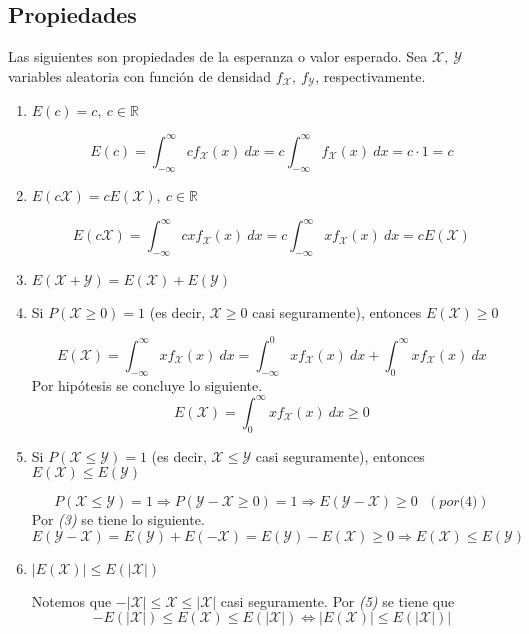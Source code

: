 \subsection{Propiedades}
Las siguientes son propiedades de la esperanza o valor esperado. Sea $\mathcal X,~ \mathcal Y$ variables aleatoria con función de densidad $f_{\mathcal X},~ f_{\mathcal Y}$, respectivamente.
\begin{enumerate}
  \item $E(c) = c,~ c \in \mathbb R$
    \begin{myproof}
      \[E(c) = \int_{-\infty}^{\infty} c f_{\mathcal X}(x)~dx = c \int_{-\infty}^{\infty} f_{\mathcal X}(x)~dx = c \cdot 1 = c\]
    \end{myproof}
  \item $E(c \mathcal X) = c E(\mathcal X),~ c \in \mathbb R$
    \begin{myproof}
      \[E(c\mathcal X) = \int_{-\infty}^{\infty} cx f_{\mathcal X}(x)~dx = c \int_{-\infty}^{\infty} xf_{\mathcal X}(x)~dx = c E(\mathcal X)\]
    \end{myproof}
  \item $E(\mathcal X + \mathcal Y) = E(\mathcal X) + E(\mathcal Y)$
  \item Si $P(\mathcal X \ge 0) = 1$ (es decir, $\mathcal X \ge 0$ casi seguramente), entonces $E(\mathcal X) \ge 0$
    \begin{myproof}
      \[E(\mathcal X) = \int_{-\infty}^{\infty} x f_{\mathcal X}(x)~dx = \int_{-\infty}^{0} xf_{\mathcal X}(x)~dx + \int_{0}^{\infty} xf_{\mathcal X}(x)~dx\]
      Por hipótesis se concluye lo siguiente.
      \[E(\mathcal X) = \int_{0}^{\infty} xf_{\mathcal X}(x)~dx \ge 0\]
    \end{myproof}
  \item Si $P(\mathcal X \le \mathcal Y) = 1$ (es decir, $\mathcal X \le \mathcal Y$ casi seguramente), entonces $E(\mathcal X) \le E(\mathcal Y)$
    \begin{myproof}
      \[P(\mathcal X \le \mathcal Y) = 1 \Longrightarrow P(\mathcal Y - \mathcal X \ge 0) = 1 \Longrightarrow E(\mathcal Y - \mathcal X) \ge 0 ~~~(por \textit{(4)})\]
      Por \textit{(3)} se tiene lo siguiente.
      \[E(\mathcal Y - \mathcal X) = E(\mathcal Y) + E(\mathcal {-X}) = E(\mathcal Y) - E(\mathcal X) \ge 0 \Longrightarrow E(\mathcal X) \le E(\mathcal Y) \]
    \end{myproof}
  \item $|E(\mathcal X)| \le E(|\mathcal X|)$
    \begin{myproof}
      Notemos que $- |\mathcal X| \le \mathcal X \le |\mathcal X|$ casi seguramente.
      Por \textit{(5)} se tiene que
      \[-E(|\mathcal X|) \le E(\mathcal X) \le E(|\mathcal X|)
        \Longleftrightarrow
      |E(\mathcal X)| \le E(|\mathcal X|)|\]
    \end{myproof}
\end{enumerate}


